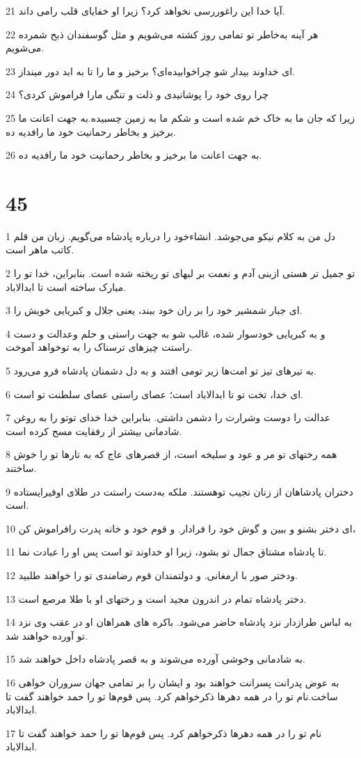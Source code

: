 \par 21 آیا خدا این راغوررسی نخواهد کرد؟ زیرا او خفایای قلب رامی داند.
\par 22 هر آینه به‌خاطر تو تمامی روز کشته می‌شویم و مثل گوسفندان ذبح شمرده می‌شویم.
\par 23 ‌ای خداوند بیدار شو چراخوابیده‌ای؟ برخیز و ما را تا به ابد دور مینداز.
\par 24 چرا روی خود را پوشانیدی و ذلت و تنگی مارا فراموش کردی؟
\par 25 زیرا که جان ما به خاک خم شده است و شکم ما به زمین چسبیده.به جهت اعانت ما برخیز و بخاطر رحمانیت خود ما رافدیه ده.
\par 26 به جهت اعانت ما برخیز و بخاطر رحمانیت خود ما رافدیه ده.
 
\chapter{45}

\par 1 دل من به کلام نیکو می‌جوشد. انشاءخود را درباره پادشاه می‌گویم. زبان من قلم کاتب ماهر است.
\par 2 تو جمیل تر هستی ازبنی آدم و نعمت بر لبهای تو ریخته شده است. بنابراین، خدا تو را مبارک ساخته است تا ابدالاباد.
\par 3 ‌ای جبار شمشیر خود را بر ران خود ببند، یعنی جلال و کبریایی خویش را.
\par 4 و به کبریایی خودسوار شده، غالب شو به جهت راستی و حلم وعدالت و دست راستت چیزهای ترسناک را به توخواهد آموخت.
\par 5 به تیرهای تیز تو امت‌ها زیر تومی افتند و به دل دشمنان پادشاه فرو می‌رود.
\par 6 ‌ای خدا، تخت تو تا ابدالاباد است؛ عصای راستی عصای سلطنت تو است.
\par 7 عدالت را دوست وشرارت را دشمن داشتی. بنابراین خدا خدای توتو را به روغن شادمانی بیشتر از رفقایت مسح کرده است.
\par 8 همه رختهای تو مر و عود و سلیخه است، از قصرهای عاج که به تارها تو را خوش ساختند.
\par 9 دختران پادشاهان از زنان نجیب توهستند. ملکه به‌دست راستت در طلای اوفیرایستاده است.
\par 10 ‌ای دختر بشنو و ببین و گوش خود را فرادار. و قوم خود و خانه پدرت رافراموش کن،
\par 11 تا پادشاه مشتاق جمال تو بشود، زیرا او خداوند تو است پس او را عبادت نما.
\par 12 ودختر صور با ارمغانی. و دولتمندان قوم رضامندی تو را خواهند طلبید.
\par 13 دختر پادشاه تمام در اندرون مجید است و رختهای او با طلا مرصع است.
\par 14 به لباس طرازدار نزد پادشاه حاضر می‌شود. باکره های همراهان او در عقب وی نزد تو آورده خواهند شد.
\par 15 به شادمانی وخوشی آورده می‌شوند و به قصر پادشاه داخل خواهند شد.
\par 16 به عوض پدرانت پسرانت خواهند بود و ایشان را بر تمامی جهان سروران خواهی ساخت.نام تو را در همه دهرها ذکرخواهم کرد. پس قوم‌ها تو را حمد خواهند گفت تا ابدالاباد.
\par 17 نام تو را در همه دهرها ذکرخواهم کرد. پس قوم‌ها تو را حمد خواهند گفت تا ابدالاباد.
 
